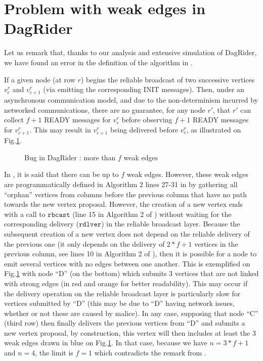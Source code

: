 

\section{Problem with weak edges in DagRider\label{anx:bug_dagrider}}


Let us remark that, thanks to our analysis and extensive simulation of DagRider, we have found an error in the definition of the algorithm in \cite{all_you_need_is_dag}.

If a given node (at row $r$) begins the reliable broadcast of two successive vertices $v^r_c$ and $v^r_{c+1}$ (via emitting the corresponding INIT messages). Then, under an asynchronous communication model, and due to the non-determinism incurred by networked communications, there are no guarantee, for any node $r'$, that $r'$ can collect $f+1$ READY messages for $v^r_c$ before observing $f+1$ READY messages for $v^r_{c+1}$. This may result in $v^r_{c+1}$ being delivered before $v^r_{c}$, as illustrated on Fig.\ref{fig:dagrider_bug}.

\begin{figure}[h]
    \centering
    \scalebox{.9}{}
    \caption{Bug in DagRider : more than $f$ weak edges}
    \label{fig:dagrider_bug}
\end{figure}

In \cite{all_you_need_is_dag}, it is said that there can be up to $f$ weak edges.
However, these weak edges are programmatically defined in Algorithm 2 lines 27-31 in \cite{all_you_need_is_dag} by gathering all ``orphan'' vertices from columns before the previous column that have no path towards the new vertex proposal.
However, the creation of a new vertex ends with a call to $\mathtt{rbcast}$ (line 15 in Algorithm 2 of \cite{all_you_need_is_dag}) without waiting for the corresponding delivery ($\mathtt{rdlver}$) in the reliable broadcast layer. 
Because the subsequent creation of a new vertex does not depend on the reliable delivery of the previous one (it only depends on the delivery of $2*f+1$ vertices in the previous column, see lines 10 in Algorithm 2 of \cite{all_you_need_is_dag}), then it is possible for a node to emit several vertices with no edges between one another. 
This is exemplified on Fig.\ref{fig:dagrider_bug} with node ``D'' (on the bottom) which submits 3 vertices that are not linked with strong edges (in red and orange for better readability). This may occur if the delivery operation on the reliable broadcast layer is particularly slow for vertices submitted by ``D'' (this may be due to ``D'' having network issues, whether or not these are caused by malice).
In any case, supposing that node ``C'' (third row) then finally delivers the previous vertices from ``D'' and submits a new vertex proposal, by construction, this vertex will then includes at least the 3 weak edges drawn in blue on Fig.\ref{fig:dagrider_bug}.
In that case, because we have $n = 3*f+1$ and $n=4$, the limit is $f=1$ which contradicts the remark from \cite{all_you_need_is_dag}.

